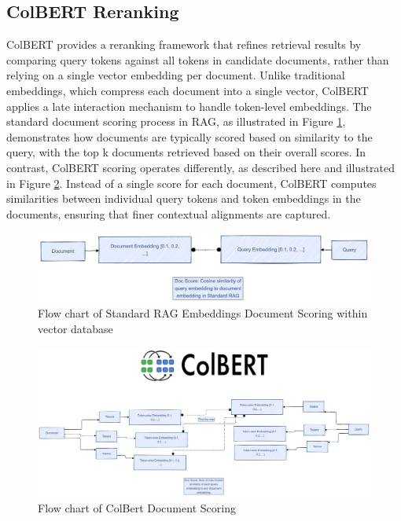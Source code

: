 \documentclass[pdflatex,sn-mathphys-num]{sn-jnl}%
\theoremstyle{thmstyleone}%
\theoremstyle{thmstyletwo}%
\theoremstyle{thmstylethree}%
\begin{document}
\subsection{ColBERT Reranking} \label{subsec3.5}
ColBERT \cite{khattab2020colbert} provides a reranking framework that refines retrieval results by comparing query tokens against all tokens in candidate documents, rather than relying on a single vector embedding per document. Unlike traditional embeddings, which compress each document into a single vector, ColBERT applies a late interaction mechanism to handle token-level embeddings. The standard document scoring process in RAG, as illustrated in Figure \ref{fig:standard_doc_scoring}, demonstrates how documents are typically scored based on similarity to the query, with the top k documents retrieved based on their overall scores. In contrast, ColBERT scoring operates differently, as described here and illustrated in Figure \ref{fig:colbert}. Instead of a single score for each document, ColBERT computes similarities between individual query tokens and token embeddings in the documents, ensuring that finer contextual alignments are captured.


\begin{figure}[h]
	\centering
	\includegraphics[width=\linewidth]{StandardRAGDocumentScoring.pdf}
	\caption{Flow chart of Standard RAG Embeddings Document Scoring within vector database}
	\label{fig:standard_doc_scoring}
\end{figure}

\begin{figure}[h]
	\centering
	\includegraphics[width=\linewidth]{Colbert.pdf}
	\caption{Flow chart of ColBert Document Scoring}
	\label{fig:colbert}
\end{figure}
\end{document}
